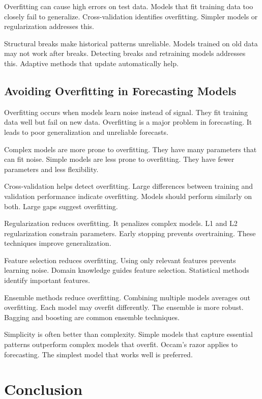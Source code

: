 Overfitting can cause high errors on test data. Models that fit training data too closely fail to generalize. Cross-validation identifies overfitting. Simpler models or regularization addresses this.

Structural breaks make historical patterns unreliable. Models trained on old data may not work after breaks. Detecting breaks and retraining models addresses this. Adaptive methods that update automatically help.

\subsection{Avoiding Overfitting in Forecasting Models}

Overfitting occurs when models learn noise instead of signal. They fit training data well but fail on new data. Overfitting is a major problem in forecasting. It leads to poor generalization and unreliable forecasts.

Complex models are more prone to overfitting. They have many parameters that can fit noise. Simple models are less prone to overfitting. They have fewer parameters and less flexibility.

Cross-validation helps detect overfitting. Large differences between training and validation performance indicate overfitting. Models should perform similarly on both. Large gaps suggest overfitting.

Regularization reduces overfitting. It penalizes complex models. L1 and L2 regularization constrain parameters. Early stopping prevents overtraining. These techniques improve generalization.

Feature selection reduces overfitting. Using only relevant features prevents learning noise. Domain knowledge guides feature selection. Statistical methods identify important features.

Ensemble methods reduce overfitting. Combining multiple models averages out overfitting. Each model may overfit differently. The ensemble is more robust. Bagging and boosting are common ensemble techniques.

Simplicity is often better than complexity. Simple models that capture essential patterns outperform complex models that overfit. Occam's razor applies to forecasting. The simplest model that works well is preferred.



\section{Conclusion}

